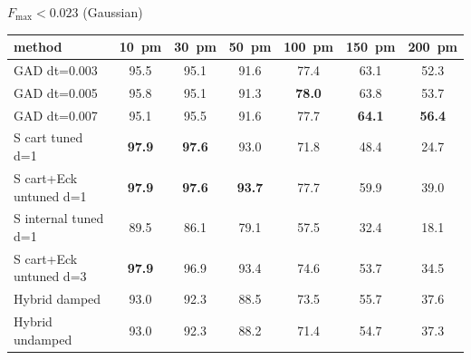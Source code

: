 \documentclass[11pt]{article}
\begin{document}
\begin{center}\footnotesize
\textbf{$F_\mathrm{max}<0.023$} (Gaussian)\\[0.3em]
\begin{tabular}{l|cccccc}
\toprule
\textbf{method} & \textbf{10~pm} & \textbf{30~pm} & \textbf{50~pm} & \textbf{100~pm} & \textbf{150~pm} & \textbf{200~pm} \\
\midrule
GAD dt=0.003                   & 95.5 & 95.1 & 91.6 & 77.4 & 63.1 & 52.3 \\
GAD dt=0.005                   & 95.8 & 95.1 & 91.3 & \textbf{78.0} & 63.8 & 53.7 \\
GAD dt=0.007                   & 95.1 & 95.5 & 91.6 & 77.7 & \textbf{64.1} & \textbf{56.4} \\
\midrule
S cart tuned d=1               & \textbf{97.9} & \textbf{97.6} & 93.0 & 71.8 & 48.4 & 24.7 \\
S cart+Eck untuned d=1         & \textbf{97.9} & \textbf{97.6} & \textbf{93.7} & 77.7 & 59.9 & 39.0 \\
S internal tuned d=1           & 89.5 & 86.1 & 79.1 & 57.5 & 32.4 & 18.1 \\
S cart+Eck untuned d=3         & \textbf{97.9} & 96.9 & 93.4 & 74.6 & 53.7 & 34.5 \\
\midrule
Hybrid damped                  & 93.0 & 92.3 & 88.5 & 73.5 & 55.7 & 37.6 \\
Hybrid undamped                & 93.0 & 92.3 & 88.2 & 71.4 & 54.7 & 37.3 \\
\bottomrule
\end{tabular}
\end{center}
\end{document}

